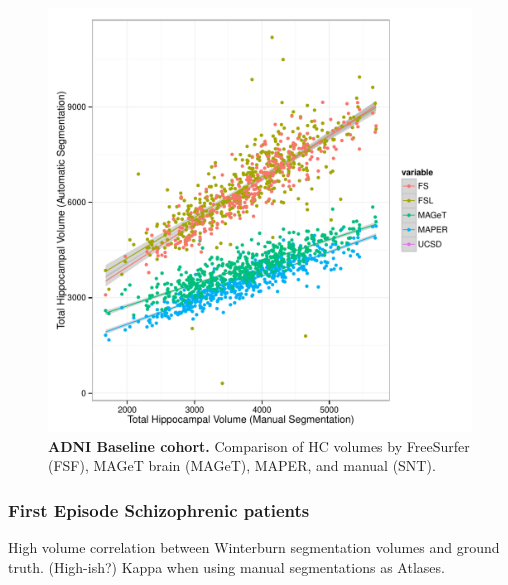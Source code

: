 \documentclass{article}\usepackage{graphicx, color}
\makeatletter
\def\maxwidth{ %
  \ifdim\Gin@nat@width>\linewidth
    \linewidth
  \else
    \Gin@nat@width
  \fi
}
\newenvironment{knitrout}{}{} %
\makeatother
\begin{document}
\begin{figure}[h]
\begin{knitrout}
\color{fgcolor}

{\centering \includegraphics[width=\maxwidth]{figure/ADNI-baseline-volumes-plot} 

}


\end{knitrout}

  \caption{{\bf ADNI Baseline cohort.} Comparison of HC volumes by FreeSurfer (FSF), MAGeT brain (MAGeT), MAPER, and manual (SNT).}
  \label{ADNI-baseline-volumes-plot}
\end{figure}

\subsubsection{First Episode Schizophrenic patients}
High volume correlation between Winterburn segmentation volumes and ground truth.  (High-ish?) Kappa when using manual segmentations as Atlases. 
\end{document}
